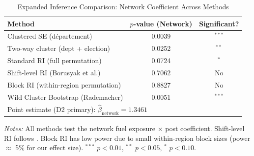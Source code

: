 \begin{table}[htbp]
\centering
\caption{Expanded Inference Comparison: Network Coefficient Across Methods}
\label{tab:inference_expanded}
\begin{threeparttable}
\begin{tabular}{lcc}
\toprule
Method & $p$-value (Network) & Significant? \\
\midrule
Clustered SE (département) & 0.0039 & $^{***}$ \\
Two-way cluster (dept + election) & 0.0252 & $^{**}$ \\
Standard RI (full permutation) & 0.0724 & $^{*}$ \\
Shift-level RI (Borusyak et al.) & 0.7062 & No \\
Block RI (within-region permutation) & 0.8827 & No \\
Wild Cluster Bootstrap (Rademacher) & 0.0051 & $^{***}$ \\
\midrule
\multicolumn{3}{l}{Point estimate (D2 primary): $\hat{\beta}_{\text{network}} = 1.3461$} \\
\bottomrule
\end{tabular}
\begin{tablenotes}[flushleft]\footnotesize
\item \textit{Notes:} All methods test the network fuel exposure $\times$ post coefficient. Shift-level RI follows \citet{borusyak2022quasi}. Block RI has low power due to small within-region block sizes (power $\approx$ 5\% for our effect size). $^{***}$ $p<0.01$, $^{**}$ $p<0.05$, $^{*}$ $p<0.10$.
\end{tablenotes}
\end{threeparttable}
\end{table}

